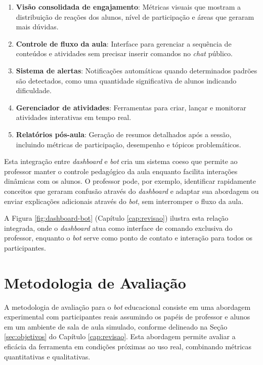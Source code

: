 \begin{enumerate}
\item \textbf{Visão consolidada de engajamento}: Métricas visuais que mostram a
distribuição de reações dos alunos, nível de participação e áreas que geraram
mais dúvidas.
\item \textbf{Controle de fluxo da aula}: Interface para gerenciar a sequência
de conteúdos e atividades sem precisar inserir comandos no \textit{chat}
público.
\item \textbf{Sistema de alertas}: Notificações automáticas quando determinados
padrões são detectados, como uma quantidade significativa de alunos indicando
dificuldade.
\item \textbf{Gerenciador de atividades}: Ferramentas para criar, lançar e
monitorar atividades interativas em tempo real.
\item \textbf{Relatórios pós-aula}: Geração de resumos detalhados após a sessão,
incluindo métricas de participação, desempenho e tópicos problemáticos.
\end{enumerate}

Esta integração entre \textit{dashboard} e \textit{bot} cria um sistema coeso
que permite ao professor manter o controle pedagógico da aula enquanto facilita
interações dinâmicas com os alunos. O professor pode, por exemplo, identificar
rapidamente conceitos que geraram confusão através do \textit{dashboard} e
adaptar sua abordagem ou enviar explicações adicionais através do \textit{bot},
sem interromper o fluxo da aula.

A Figura \ref{fig:dashboard-bot} (Capítulo \ref{cap:revisao}) ilustra esta
relação integrada, onde o \textit{dashboard} atua como interface de comando
exclusiva do professor, enquanto o \textit{bot} serve como ponto de contato e
interação para todos os participantes.

\section{Metodologia de Avaliação}
\label{sec:metodologia}

A metodologia de avaliação para o \textit{bot} educacional consiste em uma
abordagem experimental com participantes reais assumindo os papéis de professor
e alunos em um ambiente de sala de aula simulado, conforme delineado na Seção
\ref{sec:objetivos} do Capítulo \ref{cap:revisao}. Esta abordagem permite
avaliar a eficácia da ferramenta em condições próximas ao uso real, combinando
métricas quantitativas e qualitativas.

